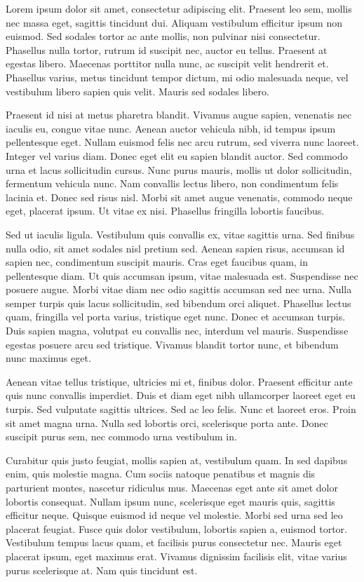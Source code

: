 {
Lorem ipsum dolor sit amet, consectetur adipiscing elit. Praesent leo sem, mollis nec massa eget, sagittis tincidunt dui. Aliquam vestibulum efficitur ipsum non euismod. Sed sodales tortor ac ante mollis, non pulvinar nisi consectetur. Phasellus nulla tortor, rutrum id suscipit nec, auctor eu tellus. Praesent at egestas libero. Maecenas porttitor nulla nunc, ac suscipit velit hendrerit et. Phasellus varius, metus tincidunt tempor dictum, mi odio malesuada neque, vel vestibulum libero sapien quis velit. Mauris sed sodales libero.

Praesent id nisi at metus pharetra blandit. Vivamus augue sapien, venenatis nec iaculis eu, congue vitae nunc. Aenean auctor vehicula nibh, id tempus ipsum pellentesque eget. Nullam euismod felis nec arcu rutrum, sed viverra nunc laoreet. Integer vel varius diam. Donec eget elit eu sapien blandit auctor. Sed commodo urna et lacus sollicitudin cursus. Nunc purus mauris, mollis ut dolor sollicitudin, fermentum vehicula nunc. Nam convallis lectus libero, non condimentum felis lacinia et. Donec sed risus nisl. Morbi sit amet augue venenatis, commodo neque eget, placerat ipsum. Ut vitae ex nisi. Phasellus fringilla lobortis faucibus.

Sed ut iaculis ligula. Vestibulum quis convallis ex, vitae sagittis urna. Sed finibus nulla odio, sit amet sodales nisl pretium sed. Aenean sapien risus, accumsan id sapien nec, condimentum suscipit mauris. Cras eget faucibus quam, in pellentesque diam. Ut quis accumsan ipsum, vitae malesuada est. Suspendisse nec posuere augue. Morbi vitae diam nec odio sagittis accumsan sed nec urna. Nulla semper turpis quis lacus sollicitudin, sed bibendum orci aliquet. Phasellus lectus quam, fringilla vel porta varius, tristique eget nunc. Donec et accumsan turpis. Duis sapien magna, volutpat eu convallis nec, interdum vel mauris. Suspendisse egestas posuere arcu sed tristique. Vivamus blandit tortor nunc, et bibendum nunc maximus eget.

Aenean vitae tellus tristique, ultricies mi et, finibus dolor. Praesent efficitur ante quis nunc convallis imperdiet. Duis et diam eget nibh ullamcorper laoreet eget eu turpis. Sed vulputate sagittis ultrices. Sed ac leo felis. Nunc et laoreet eros. Proin sit amet magna urna. Nulla sed lobortis orci, scelerisque porta ante. Donec suscipit purus sem, nec commodo urna vestibulum in.

Curabitur quis justo feugiat, mollis sapien at, vestibulum quam. In sed dapibus enim, quis molestie magna. Cum sociis natoque penatibus et magnis dis parturient montes, nascetur ridiculus mus. Maecenas eget ante sit amet dolor lobortis consequat. Nullam ipsum nunc, scelerisque eget mauris quis, sagittis efficitur neque. Quisque euismod id neque vel molestie. Morbi sed urna sed leo placerat feugiat. Fusce quis dolor vestibulum, lobortis sapien a, euismod tortor. Vestibulum tempus lacus quam, et facilisis purus consectetur nec. Mauris eget placerat ipsum, eget maximus erat. Vivamus dignissim facilisis elit, vitae varius purus scelerisque at. Nam quis tincidunt est.


}
